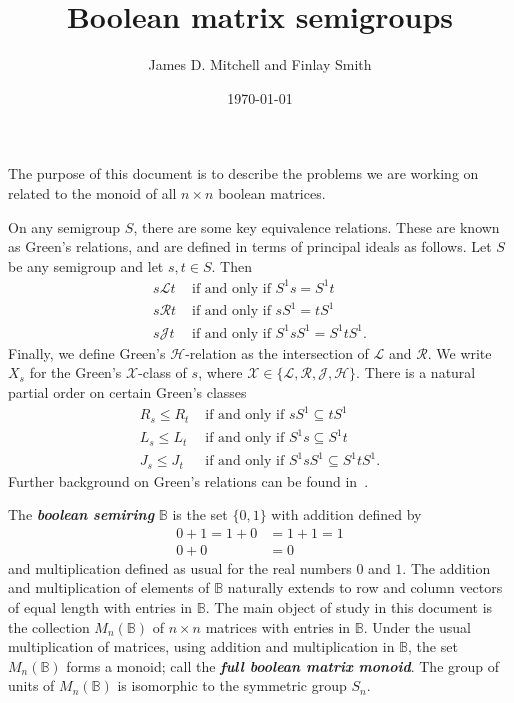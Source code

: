 \documentclass[11pt]{article}
\title{Boolean matrix semigroups}
\author{James D. Mitchell and Finlay Smith}
\date{\today}
\newcommand{\defn}[1]{\textbf{\textit{#1}}}
\numberwithin{equation}{section}
\newcommand{\B}{\mathbb{B}}
\newcommand{\Bn}{M_n(\B)}
\renewcommand{\L}{\mathscr{L}}
\newcommand{\R}{\mathscr{R}}
\newcommand{\J}{\mathscr{J}}
\renewcommand{\H}{\mathscr{H}}
\begin{document}
\maketitle

\addtocounter{section}{1}


The purpose of this document is to describe the problems we are working on
related to the monoid of all $n\times n$ boolean matrices.

On any semigroup $S$, there are some key equivalence relations. These are known
as Green's relations, and are defined in terms of principal ideals as follows.
Let $S$ be any semigroup and let $s, t \in S$. Then
\begin{align*}
  s \L t &\text{ if and only if } S^1 s = S^1 t \\
  s \R t &\text{ if and only if } s S^1 = t S^1 \\
  s \J t &\text{ if and only if } S^1 s S^1 = S^1 t S^1.
\end{align*}
Finally, we define Green's $\H$-relation as the intersection of $\L$ and $\R$.
We write $X_s$ for the Green's $\mathcal{X}$-class of $s$, where
$\mathcal{X} \in \{\L, \R, \J, \H\}$.
There is a natural partial order on certain Green's classes
\begin{align*}
  R_s \leq R_t &\text{ if and only if } sS^1 \subseteq tS^1 \\
  L_s \leq L_t &\text{ if and only if } S^1s \subseteq S^1t \\
  J_s \leq J_t &\text{ if and only if } S^1 s S^1 \subseteq S^1 t S^1.
\end{align*}
Further background on Green's relations can be found in~\cite{Howie1995aa}.


The \defn{boolean semiring} $\B$ is the set $\{0, 1\}$ with addition defined by 
\begin{align*}
  0 + 1 = 1 + 0 &= 1 + 1 = 1 \\
  0 + 0 &= 0
\end{align*}
and multiplication defined as usual for the real numbers $0$ and $1$.  The
addition and multiplication of elements of $\B$ naturally extends to row and
column vectors of equal length with entries in $\B$.  The main object of study
in this document is the collection $\Bn$ of $n\times n$ matrices with entries
in $\B$. Under the usual multiplication of matrices, using addition and
multiplication in $\B$, the set $\Bn$ forms a monoid; call the \defn{full
boolean matrix monoid}.  The group of units of $\Bn$ is isomorphic to the
symmetric group $S_n$.
\end{document}
